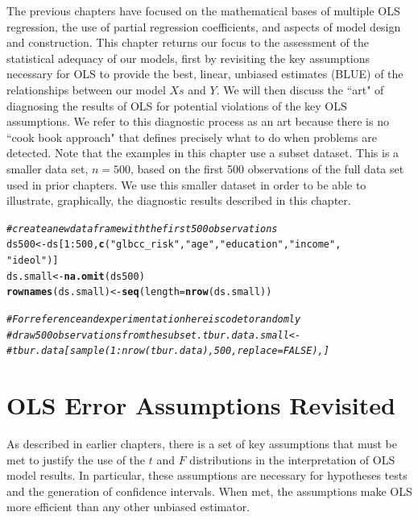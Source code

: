 \documentclass[11pt,openany]{book}\usepackage[]{graphicx}\usepackage[]{color}
\makeatletter
\newcommand{\hlnum}[1]{\textcolor[rgb]{0.686,0.059,0.569}{#1}}%
\newcommand{\hlstr}[1]{\textcolor[rgb]{0.192,0.494,0.8}{#1}}%
\newcommand{\hlcom}[1]{\textcolor[rgb]{0.678,0.584,0.686}{\textit{#1}}}%
\newcommand{\hlopt}[1]{\textcolor[rgb]{0,0,0}{#1}}%
\newcommand{\hlstd}[1]{\textcolor[rgb]{0.345,0.345,0.345}{#1}}%
\newcommand{\hlkwb}[1]{\textcolor[rgb]{0.69,0.353,0.396}{#1}}%
\newcommand{\hlkwc}[1]{\textcolor[rgb]{0.333,0.667,0.333}{#1}}%
\newcommand{\hlkwd}[1]{\textcolor[rgb]{0.737,0.353,0.396}{\textbf{#1}}}%
\newenvironment{kframe}{%
 \def\at@end@of@kframe{}%
 \ifinner\ifhmode%
  \def\at@end@of@kframe{\end{minipage}}%
  \begin{minipage}{\columnwidth}%
 \fi\fi%
 \def\FrameCommand##1{\hskip\@totalleftmargin \hskip-\fboxsep
 \colorbox{shadecolor}{##1}\hskip-\fboxsep
     \hskip-\linewidth \hskip-\@totalleftmargin \hskip\columnwidth}%
 \MakeFramed {\advance\hsize-\width
   \@totalleftmargin\z@ \linewidth\hsize
   \@setminipage}}%
 {\par\unskip\endMakeFramed%
 \at@end@of@kframe}
\newenvironment{knitrout}{}{} %
\renewenvironment{knitrout}{\begin{singlespace}}{\end{singlespace}} %
\makeatother
\begin{document}
The previous chapters have focused on the mathematical bases of multiple OLS regression, the use of partial regression coefficients, and aspects of model design and construction. This chapter returns our focus to the assessment of the statistical adequacy of our models, first by revisiting the key assumptions necessary for OLS to provide the best, linear, unbiased estimates (BLUE) of the relationships between our model $Xs$ and $Y$. We will then discuss the ``art" of diagnosing the results of OLS for potential violations of the key OLS assumptions.  We refer to this diagnostic process as an art because there is no ``cook book approach" that defines precisely what to do when problems are detected. Note that the examples in this chapter use a subset dataset. This is a smaller data set, $n=500$, based on the first 500 observations of the full data set used in prior chapters. We use this smaller dataset in order to be able to illustrate, graphically, the diagnostic results described in this chapter.

\begin{knitrout}
\color{fgcolor}\begin{kframe}
\begin{alltt}
\hlcom{# create a new data frame with the first 500 observations}
\hlstd{ds500} \hlkwb{<-} \hlstd{ds[}\hlnum{1}\hlopt{:}\hlnum{500}\hlstd{,} \hlkwd{c}\hlstd{(}\hlstr{"glbcc_risk"}\hlstd{,} \hlstr{"age"}\hlstd{,} \hlstr{"education"}\hlstd{,} \hlstr{"income"}\hlstd{,}
    \hlstr{"ideol"}\hlstd{)]}
\hlstd{ds.small} \hlkwb{<-} \hlkwd{na.omit}\hlstd{(ds500)}
\hlkwd{rownames}\hlstd{(ds.small)} \hlkwb{<-} \hlkwd{seq}\hlstd{(}\hlkwc{length} \hlstd{=} \hlkwd{nrow}\hlstd{(ds.small))}

\hlcom{# For reference and experimentation here is code to randomly}
\hlcom{# draw 500 observations from the subset.  tbur.data.small <-}
\hlcom{# tbur.data[sample(1:nrow(tbur.data), 500, replace=FALSE),]}
\end{alltt}
\end{kframe}
\end{knitrout}

\section{OLS Error Assumptions Revisited} 

As described in earlier chapters, there is a set of key assumptions that must be met to justify the use of the $t$ and $F$ distributions in the interpretation of OLS model results. In particular, these assumptions are necessary for hypotheses tests and the generation of confidence intervals. When met, the assumptions make OLS more efficient than any other unbiased estimator. 
\end{document}
